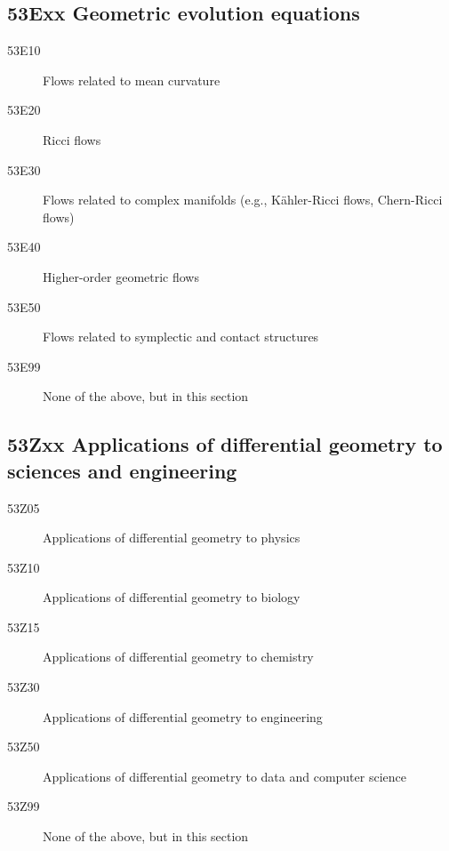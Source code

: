 \documentclass[letterpaper]{article}
\begin{document}
\subsection*{53Exx Geometric evolution equations}\label{53Exx}
\begin{description}
\item [53E10]\label{53E10} Flows related to mean curvature
\item [53E20]\label{53E20} Ricci flows
\item [53E30]\label{53E30} Flows related to complex manifolds (e.g., K\"{a}hler-Ricci flows, Chern-Ricci flows)
\item [53E40]\label{53E40} Higher-order geometric flows
\item [53E50]\label{53E50} Flows related to symplectic and contact structures
\item [53E99]\label{53E99} None of the above, but in this section
\end{description}
\subsection*{53Zxx  Applications of differential geometry to sciences and engineering}\label{53Zxx}
\begin{description} 
\item [53Z05]\label{53Z05} Applications of differential geometry to physics
\item [53Z10]\label{53Z10} Applications of differential geometry to biology
\item [53Z15]\label{53Z15} Applications of differential geometry to chemistry
\item [53Z30]\label{53Z30} Applications of differential geometry to engineering
\item [53Z50]\label{53Z50} Applications of differential geometry to data and computer science
\item [53Z99]\label{53Z99} None of the above, but in this section
\end{description}
\end{document}
